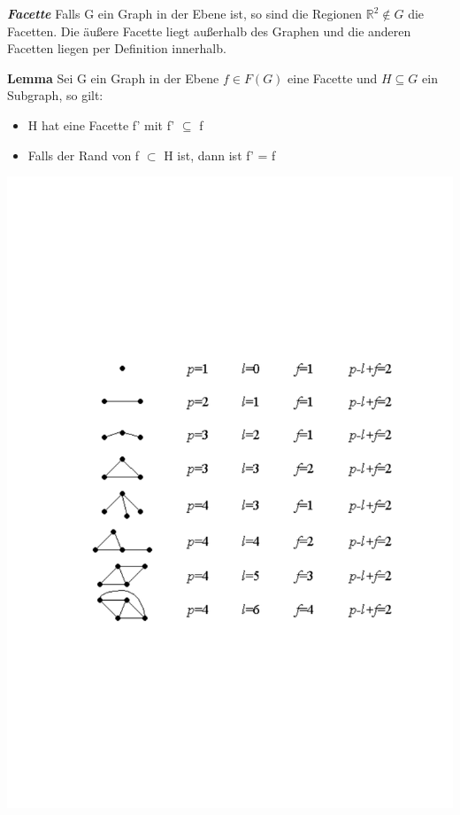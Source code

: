 \textbf{\textit{Facette}}\newline
Falls G ein Graph in der Ebene ist, so sind die Regionen $\mathbb{R}^2 \notin G$ die Facetten. Die äußere Facette liegt außerhalb des Graphen und die anderen Facetten liegen per Definition innerhalb. \newline

\newpage
\textbf{Lemma} \newline
Sei G ein Graph in der Ebene $f \in F(G)$ eine Facette und $H \subseteq G$ ein Subgraph, so gilt:
\begin{itemize}
	\item H hat eine Facette f' mit f' $\subseteq$ f
	\item Falls der Rand von f $\subset$ H ist, dann ist f' = f
\end{itemize}
\includegraphics[scale=0.5]{lectures/161118/pix/planareGraphenElementar.pdf}\newline

